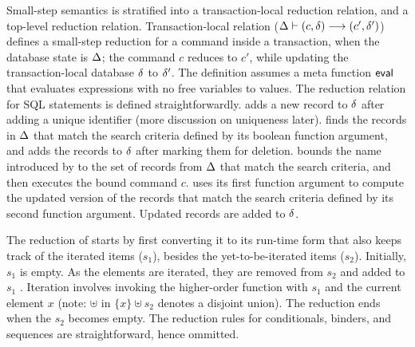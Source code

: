 Small-step semantics is stratified into a transaction-local reduction
relation, and a top-level reduction relation. Transaction-local
relation ($\Delta \vdash (c,\delta) \longrightarrow (c',\delta')$) defines a
small-step reduction for a command inside a transaction, when the
database state is $\Delta$; the command $c$ reduces to $c'$, while
updating the transaction-local database $\delta$ to $\delta'$. The
definition assumes a meta function $\textsf{eval}$ that evaluates expressions
with no free variables to values. The reduction relation for SQL
statements is defined straightforwardly.   adds a new record
to $\delta$ after adding a unique identifier (more discussion on
uniqueness later).  finds the records in $\Delta$ that match
the search criteria defined by its boolean function argument, and adds
the records to $\delta$ after marking them for deletion. 
bounds the name introduced by  to the set of records from
$\Delta$ that match the search criteria, and then executes the bound
command $c$.  uses its first function argument to compute
the updated version of the records that match the search criteria
defined by its second function argument. Updated records are added to
$\delta$. 

The reduction of  starts by first converting it to its
run-time form that also keeps track of the iterated items ($s_1$),
besides the yet-to-be-iterated items ($s_2$). Initially, $s_1$ is
empty. As the elements are iterated, they are removed from $s_2$ and
added to $s_1$ . Iteration involves invoking the higher-order function
with $s_1$ and the current element $x$ (note: $\uplus$ in $\{x\}
\uplus s_2$ denotes a disjoint union). The reduction ends when the
$s_2$ becomes empty. The reduction rules for conditionals, 
binders, and sequences are straightforward, hence ommitted.

